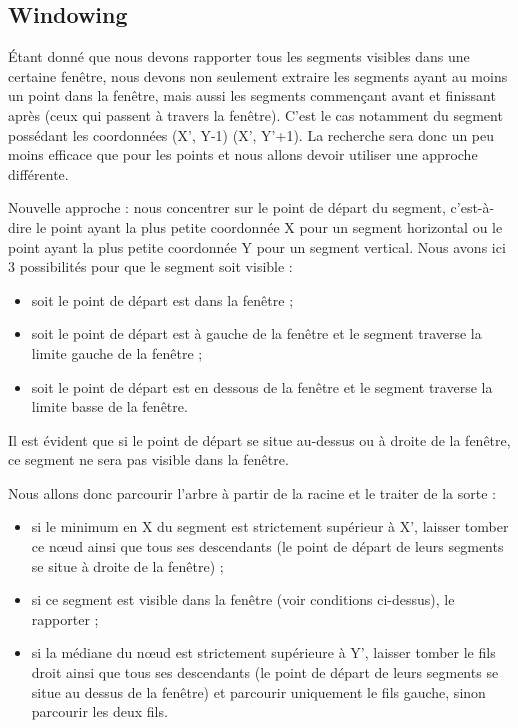\documentclass[10pt,a4paper]{article}
\begin{document}
\subsection{Windowing}
Étant donné que nous devons rapporter tous les segments visibles dans une certaine fenêtre, nous devons non seulement extraire les segments ayant au moins un point dans la fenêtre, mais aussi les segments commençant avant et finissant après (ceux qui passent à travers la fenêtre). C'est le cas notamment du segment possédant les coordonnées (X', Y-1) (X', Y'+1). La recherche sera donc un peu moins efficace que pour les points et nous allons devoir utiliser une approche différente.

Nouvelle approche : nous concentrer sur le point de départ du segment, c'est-à-dire le point ayant la plus petite coordonnée X pour un segment horizontal ou le point ayant la plus petite coordonnée Y pour un segment vertical. Nous avons ici 3 possibilités pour que le segment soit visible :
\begin{itemize}
	\item soit le point de départ est dans la fenêtre ;
	\item soit le point de départ est à gauche de la fenêtre et le segment traverse la limite gauche de la fenêtre ;
	\item soit le point de départ est en dessous de la fenêtre et le segment traverse la limite basse de la fenêtre.
\end{itemize}
Il est évident que si le point de départ se situe au-dessus ou à droite de la fenêtre, ce segment ne sera pas visible dans la fenêtre.

Nous allons donc parcourir l'arbre à partir de la racine et le traiter de la sorte :
\begin{itemize}
	\item si le minimum en X du segment est strictement supérieur à X', laisser tomber ce nœud ainsi que tous ses descendants (le point de départ de leurs segments se situe à droite de la fenêtre) ;
	\item si ce segment est visible dans la fenêtre (voir conditions ci-dessus), le rapporter ;
	\item si la médiane du nœud est strictement supérieure à Y', laisser tomber le fils droit ainsi que tous ses descendants (le point de départ de leurs segments se situe au dessus de la fenêtre) et parcourir uniquement le fils gauche, sinon parcourir les deux fils.
\end{itemize}
\end{document}
